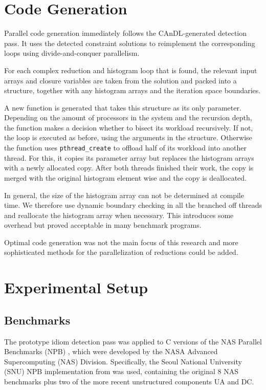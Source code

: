 \section{Code Generation}

    Parallel code generation immediately follows the CAnDL-generated detection
    pass.
    It uses the detected constraint solutions to reimplement the corresponding
    loops using divide-and-conquer parallelism.

    For each complex reduction and histogram loop that is found, the relevant
    input arrays and closure variables are taken from the solution and packed
    into a structure, together with any histogram arrays and the iteration
    space boundaries.

    A new function is generated that takes this structure as its only parameter.
    Depending on the amount of processors in the system and the recursion
    depth, the function makes a decision whether to bisect its workload
    recursively.
    If not, the loop is executed as before, using the arguments in the
    structure.
    Otherwise the function uses \texttt{pthread\_create} to offload half of its
    workload into another thread.
    For this, it copies its parameter array but replaces the histogram arrays
    with a newly allocated copy.
    After both threads finished their work, the copy is merged with the original
    histogram element wise and the copy is deallocated.

    In general, the size of the histogram array can not be determined at
    compile time.
    We therefore use dynamic boundary checking in all the branched off threads
    and reallocate the histogram array when necessary.
    This introduces some overhead but proved acceptable in many benchmark
    programs.

    Optimal code generation was not the main focus of this research and more
    sophisticated methods for the parallelization of reductions could be added.

\section{Experimental Setup}

\subsection{Benchmarks}

    The prototype idiom detection pass was applied to C versions of the
    NAS Parallel Benchmarks (NPB) \citep{Bailey1991NPB}, which were developed
    by the NASA Advanced Supercomputing (NAS) Division.
    Specifically, the Seoul National University (SNU) NPB implementation from
    \citet{seo2011performance} was used, containing the original 8 NAS
    benchmarks plus two of the more recent unstructured components UA and DC.

